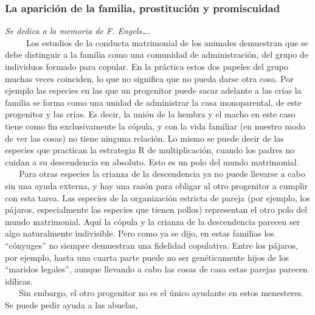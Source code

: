 \protect\hypertarget{M15A}{}{}

\subsubsection{La aparición de la familia, prostitución y promiscuidad}\label{la-apariciuxf3n-de-la-familia-prostituciuxf3n-y-promiscuidad}

\noindent
\textit{Se dedica a la memoria de F. Engels\ldots{}.}\\



~ ~ ~ Los estudios de la conducta matrimonial de los animales demuestran
que se debe distinguir a la familia como una comunidad de
administración, del grupo de individuos formado para copular. En la
práctica estos dos papeles del grupo muchas veces coinciden, lo que no
significa que no pueda darse otra cosa. Por ejemplo las especies en las
que un progenitor puede sacar adelante a las crías la familia se forma
como una unidad de administrar la casa monoparental, de este progenitor
y las crías. Es decir, la unión de la hembra y el macho en este caso
tiene como fin exclusivamente la cópula, y con la vida familiar (en
nuestro modo de ver las cosas) no tiene ninguna relación. Lo mismo se
puede decir de las especies que practican la estrategia R de
multiplicación, cuando los padres no cuidan a su descendencia en
absoluto. Esto es un polo del mundo matrimonial.\\
\hspace*{0.333em} ~ ~ Para otras especies la crianza de la descendencia
ya no puede llevarse a cabo sin una ayuda externa, y hay una razón para
obligar al otro progenitor a cumplir con esta tarea. Las especies de la
organización estricta de pareja (por ejemplo, los pájaros, especialmente
las especies que tienen pollos) representan el otro polo del mundo
matrimonial. Aquí la cópula y la crianza de la descendencia parecen ser
algo naturalmente indivisible. Pero como ya se dijo, en estas familias
los ``cónyuges'' no siempre demuestran una fidelidad copulativa. Entre
los pájaros, por ejemplo, hasta una cuarta parte puede no ser
genéticamente hijos de los ``maridos legales'', aunque llevando a cabo
las cosas de casa estas parejas parecen idílicas.\\
\hspace*{0.333em} ~ ~ Sin embargo, el otro progenitor no es el único
ayudante en estos menesteres. Se puede pedir ayuda a las abuelas,

